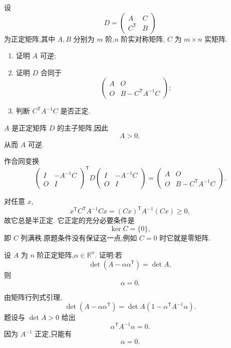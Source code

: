 \begin{example}
设
\[
D=
\begin{pmatrix}
A&C\\
C^{\mathsf T}&B
\end{pmatrix}
\]
为正定矩阵,其中 $A,B$ 分别为 $m$ 阶,$n$ 阶实对称矩阵,
$C$ 为 $m\times n$ 实矩阵.
\begin{enumerate}
    \item 证明 $A$ 可逆;
    \item 证明 $D$ 合同于
    \[
    \begin{pmatrix}
    A&O\\
    O&B-C^{\mathsf T}A^{-1}C
    \end{pmatrix};
    \]
    \item 判断 $C^{\mathsf T}A^{-1}C$ 是否正定.
\end{enumerate}
\end{example}
\exampleblank

\begin{solution}
$A$ 是正定矩阵 $D$ 的主子矩阵,因此
\[
A>0,
\]
从而 $A$ 可逆.

作合同变换
\[
\begin{pmatrix}
I&-A^{-1}C\\
O&I
\end{pmatrix}^{\mathsf T}
D
\begin{pmatrix}
I&-A^{-1}C\\
O&I
\end{pmatrix}
=
\begin{pmatrix}
A&O\\
O&B-C^{\mathsf T}A^{-1}C
\end{pmatrix}.
\]

对任意 $x$,
\[
x^{\mathsf T}C^{\mathsf T}A^{-1}Cx
=
(Cx)^{\mathsf T}A^{-1}(Cx)\ge0,
\]
故它总是半正定.
它正定的充分必要条件是
\[
\ker C=\{0\},
\]
即 $C$ 列满秩.原题条件没有保证这一点,例如 $C=0$ 时它就是零矩阵.
\end{solution}


\begin{example}
设 $A$ 为 $n$ 阶正定矩阵,$\alpha\in\mathbb{R}^n$.
证明:若
\[
\det(A-\alpha\alpha^{\mathsf T})=\det A,
\]
则
\[
\alpha=0.
\]
\end{example}
\exampleblank

\begin{solution}
由矩阵行列式引理,
\[
\det(A-\alpha\alpha^{\mathsf T})
=
\det A
\left(
1-\alpha^{\mathsf T}A^{-1}\alpha
\right).
\]
题设与 $\det A>0$ 给出
\[
\alpha^{\mathsf T}A^{-1}\alpha=0.
\]
因为 $A^{-1}$ 正定,只能有
\[
\boxed{\alpha=0}.
\]
\end{solution}


